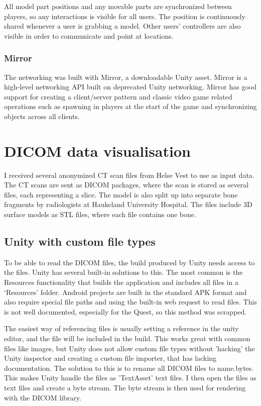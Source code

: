 \documentclass[a4paper]{report}
\begin{document}
All model part positions and any movable parts are synchronized between players, so any interactions is visible for all users. The position is continuously shared whenever a user is grabbing a model. Other users' controllers are also visible in order to communicate and point at locations.

\subsubsection{Mirror}
The networking was built with Mirror, a downloadable Unity asset. Mirror is a high-level networking API built on deprecated Unity networking\cite{noauthor_mirror_nodate}. Mirror has good support for creating a client/server pattern and classic video game related operations such as spawning in players at the start of the game and synchronizing objects across all clients.

\section{DICOM data visualisation}
I received several anonymized CT scan files from Helse Vest to use as input data. The CT scans are sent as DICOM packages\cite{noauthor_dicom_nodate}, where the scan is stored as several files, each representing a slice.
The model is also split up into separate bone fragments by radiologists at Haukeland University Hospital. The files include 3D surface models as STL files, where each file contains one bone.


\subsection{Unity with custom file types}

To be able to read the DICOM files, the build produced by Unity needs access to the files. Unity has several built-in solutions to this.
The most common is the Resources functionality\cite{resourcesload_unity_nodate} that builds the application and includes all files in a `Resources' folder. Android projects are built in the standard APK format and also require special file paths and using the built-in web request to read files. This is not well documented, especially for the Quest, so this method was scrapped.

The easiest way of referencing files is usually setting a reference in the unity editor, and the file will be included in the build. This works great with common files like images, but Unity does not allow custom file types without 'hacking' the Unity inspector and creating a custom file importer\cite{scriptedimporters_unity_nodate}, that has lacking documentation. The solution to this is to rename all DICOM files to {name}.bytes. This makes Unity handle the files as 'TextAsset' text files\cite{textassets_unity_nodate}. I then open the files as text files and create a byte stream. The byte stream is then used for rendering with the DICOM library.
\end{document}
